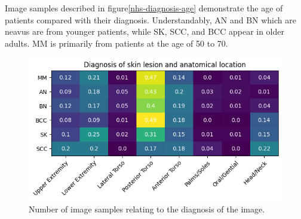 Image samples described in figure\ref{nhs-diagnosis-age} demonstrate the age of patients compared with their diagnosis. Understandably, AN and BN which are neavus are from younger patients, while SK, SCC, and BCC appear in older adults. MM is primarily from patients at the age of 50 to 70.

\begin{figure}
	\centering
	\includegraphics[scale=0.75]{images/nhs/nhs-location-diagnosis.png}
	\caption{Number of image samples relating to the diagnosis of the image.}
\end{figure}\label{nhs-location-diagnosis}

